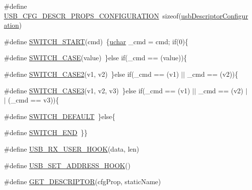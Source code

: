 \begin{DoxyCompactItemize}
\item 
\#define \hyperlink{mhvlib-_vusb-_keyboard_2vusb_2usbdrv_8c_a8aae9f682ca9f91faae0453e4351a50b}{U\-S\-B\-\_\-\-C\-F\-G\-\_\-\-D\-E\-S\-C\-R\-\_\-\-P\-R\-O\-P\-S\-\_\-\-C\-O\-N\-F\-I\-G\-U\-R\-A\-T\-I\-O\-N}~sizeof(\hyperlink{mhvlib-_vusb-_console_2vusb_2usbdrv_8h_a9a566690103d3a34df4893e7c0d3bf10}{usb\-Descriptor\-Configuration})
\item 
\#define \hyperlink{mhvlib-_vusb-_keyboard_2vusb_2usbdrv_8c_ac56b9d981e3fec2bbfb3f15788f6bdb2}{S\-W\-I\-T\-C\-H\-\_\-\-S\-T\-A\-R\-T}(cmd)~\{\hyperlink{mhvlib-_vusb-_console_2vusb_2usbdrv_8h_aa8ddf20cdd716b652e76e23e5e700893}{uchar} \-\_\-cmd = cmd; if(0)\{
\item 
\#define \hyperlink{mhvlib-_vusb-_keyboard_2vusb_2usbdrv_8c_aae1cadf9c1da7851d3bf26f6044c5963}{S\-W\-I\-T\-C\-H\-\_\-\-C\-A\-S\-E}(value)~\}else if(\-\_\-cmd == (value))\{
\item 
\#define \hyperlink{mhvlib-_vusb-_keyboard_2vusb_2usbdrv_8c_aae356661dff6a8095d01d3e75dc3d733}{S\-W\-I\-T\-C\-H\-\_\-\-C\-A\-S\-E2}(v1, v2)~\}else if(\-\_\-cmd == (v1) $|$$|$ \-\_\-cmd == (v2))\{
\item 
\#define \hyperlink{mhvlib-_vusb-_keyboard_2vusb_2usbdrv_8c_a4b5329c382b93afc16758e5d08589574}{S\-W\-I\-T\-C\-H\-\_\-\-C\-A\-S\-E3}(v1, v2, v3)~\}else if(\-\_\-cmd == (v1) $|$$|$ \-\_\-cmd == (v2) $|$$|$ (\-\_\-cmd == v3))\{
\item 
\#define \hyperlink{mhvlib-_vusb-_keyboard_2vusb_2usbdrv_8c_a35f0e4ce76d1d63aeebacb74425798b8}{S\-W\-I\-T\-C\-H\-\_\-\-D\-E\-F\-A\-U\-L\-T}~\}else\{
\item 
\#define \hyperlink{mhvlib-_vusb-_keyboard_2vusb_2usbdrv_8c_a886e28203c262455d99122704a9f0be9}{S\-W\-I\-T\-C\-H\-\_\-\-E\-N\-D}~\}\}
\item 
\#define \hyperlink{mhvlib-_vusb-_keyboard_2vusb_2usbdrv_8c_a95ad02eb72be3e769e4acf0e98ae40bb}{U\-S\-B\-\_\-\-R\-X\-\_\-\-U\-S\-E\-R\-\_\-\-H\-O\-O\-K}(data, len)
\item 
\#define \hyperlink{mhvlib-_vusb-_keyboard_2vusb_2usbdrv_8c_a6a78a51b114a555f4fcc13e78af243b0}{U\-S\-B\-\_\-\-S\-E\-T\-\_\-\-A\-D\-D\-R\-E\-S\-S\-\_\-\-H\-O\-O\-K}()
\item 
\#define \hyperlink{mhvlib-_vusb-_keyboard_2vusb_2usbdrv_8c_a4f20ce9fae0dc2160ae0e8c3d8934f15}{G\-E\-T\-\_\-\-D\-E\-S\-C\-R\-I\-P\-T\-O\-R}(cfg\-Prop, static\-Name)
\end{DoxyCompactItemize}
